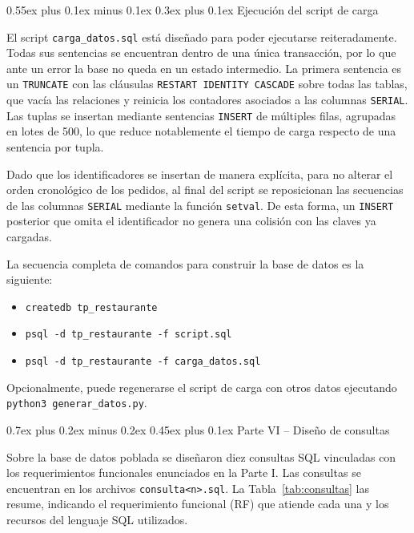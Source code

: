 \documentclass[conference,a4paper,10pt]{IEEEtran}
\makeatletter
\def\section{\@startsection{section}{1}{\z@}
{0.7ex plus 0.2ex minus 0.2ex}
{0.45ex plus 0.1ex}
{\normalfont\normalsize\bfseries}}
\def\subsection{\@startsection{subsection}{2}{\z@}
{0.55ex plus 0.1ex minus 0.1ex}
{0.3ex plus 0.1ex}
{\normalfont\small\bfseries}}
\makeatother
\begin{document}
\subsection{Ejecución del script de carga}

El script \texttt{carga\_datos.sql} está diseñado para poder ejecutarse reiteradamente. Todas sus sentencias se encuentran dentro de una única transacción, por lo que ante un error la base no queda en un estado intermedio. La primera sentencia es un \texttt{TRUNCATE} con las cláusulas
\texttt{RESTART IDENTITY CASCADE} sobre todas las tablas, que vacía las relaciones y reinicia los contadores asociados a las columnas \texttt{SERIAL}. Las tuplas se insertan mediante sentencias \texttt{INSERT} de múltiples filas, agrupadas en lotes de 500, lo que reduce notablemente el tiempo de carga respecto de una sentencia por tupla.

Dado que los identificadores se insertan de manera explícita, para no alterar el orden cronológico de los pedidos, al final del script se reposicionan las secuencias de las columnas \texttt{SERIAL} mediante la función \texttt{setval}. De esta forma, un \texttt{INSERT} posterior que omita el identificador no genera una colisión con las claves ya cargadas.

La secuencia completa de comandos para construir la base de datos es la siguiente:

\begin{itemize}
    \item \texttt{createdb tp\_restaurante}
    \item \texttt{psql -d tp\_restaurante -f script.sql}
    \item \texttt{psql -d tp\_restaurante -f carga\_datos.sql}
\end{itemize}

Opcionalmente, puede regenerarse el script de carga con otros datos ejecutando
\texttt{python3 generar\_datos.py}.


\section{Parte VI -- Diseño de consultas}

Sobre la base de datos poblada se diseñaron diez consultas SQL vinculadas con los requerimientos funcionales enunciados en la Parte I. Las consultas se encuentran en los archivos \texttt{consulta<n>.sql}. La Tabla~\ref{tab:consultas} las resume, indicando el requerimiento funcional (RF) que atiende cada una y los recursos del lenguaje SQL utilizados.
\end{document}
